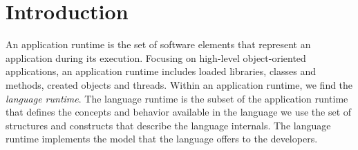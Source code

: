 
\chapter{Introduction}
\minitoc


%
%


An application runtime is the set of software elements that represent an application during its execution. Focusing on high-level object-oriented applications, an application runtime includes \eg loaded libraries, classes and methods, created objects and threads. Within an application runtime, we find the \emph{language runtime}. The language runtime is the subset of the application runtime that defines the concepts and behavior available in the language we use \ie the set of structures and constructs that describe the language internals. The language runtime implements the model that the language offers to the developers.

